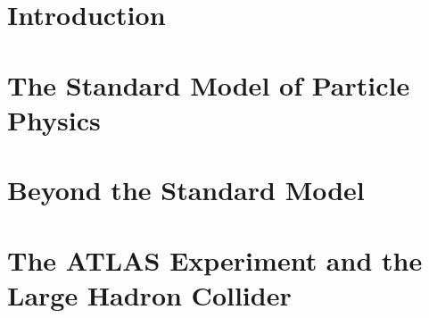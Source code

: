\documentclass[PhD, UKenglish]{scrbook}
\begin{document}
\makethesistitle

\pagestyle{scrplain}

% 

\tableofcontents

\mainmatter
\pagestyle{scrheadings}




\chapter{Introduction}
\label{sec:intro}



\chapter{The Standard Model of Particle Physics}
\label{sec:standard_model}



\chapter{Beyond the Standard Model}
\label{sec:bsm}


\chapter{The ATLAS Experiment and the Large Hadron Collider}
\label{sec:atlas_and_lhc}
\end{document}
